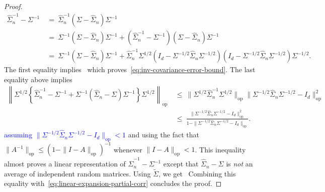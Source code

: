 \documentclass{article}
\begin{document}
\begin{appendices}
\begin{proof}
\begin{align*}
\widehat{\Sigma}_n^{-1} - \Sigma^{-1} ~&=~ \widehat{\Sigma}_n^{-1}(\Sigma - \widehat{\Sigma}_n)\Sigma^{-1}\\ ~&=~ \Sigma^{-1}(\Sigma - \widehat{\Sigma}_n)\Sigma^{-1} + (\widehat{\Sigma}_n^{-1} - \Sigma^{-1})(\Sigma - \widehat{\Sigma}_n)\Sigma^{-1}\\ ~&=~ \Sigma^{-1}(\Sigma - \widehat{\Sigma}_n)\Sigma^{-1} + \widehat{\Sigma}_n^{-1}\Sigma^{1/2}(I_d - \Sigma^{-1/2}\widehat{\Sigma}_n\Sigma^{-1/2})(I_d - \Sigma^{-1/2}\widehat{\Sigma}_n\Sigma^{-1/2})\Sigma^{-1/2}.
\end{align*}
The first equality implies
\ which proves~\eqref{eq:inv-covariance-error-bound}. The last equality above implies
\begin{equation}\label{eq:linear-expansion-partial-corr}
\begin{split}
\left\|\Sigma^{1/2}\left\{\widehat{\Sigma}_n^{-1} - \Sigma^{-1} + \Sigma^{-1}(\widehat{\Sigma}_n - \Sigma)\Sigma^{-1}\right\}\Sigma^{1/2}\right\|_{\mathrm{op}} ~&\le~ \|\Sigma^{1/2}\widehat{\Sigma}_n^{-1}\Sigma^{1/2}\|_{\mathrm{op}}\|\Sigma^{-1/2}\widehat{\Sigma}_n\Sigma^{-1/2} - I_d\|_{\mathrm{op}}^2\\ ~&\le~ \frac{\|\Sigma^{-1/2}\widehat{\Sigma}_n\Sigma^{-1/2} - I_d\|_{\mathrm{op}}^2}{1 - \|\Sigma^{-1/2}\widehat{\Sigma}_n\Sigma^{-1/2} - I_d\|_{\mathrm{op}}}.
\end{split}
\end{equation}
\textcolor{blue}{assuming $\|\Sigma^{-1/2}\widehat{\Sigma}_n\Sigma^{-1/2} - I_d\|_{\mathrm{op}} < 1$} and using the fact that $\|A^{-1}\|_{\mathrm{op}} \le (1 - \|I - A\|_{\mathrm{op}})^{-1}$ whenever $\|I - A\|_{\mathrm{op}} < 1$.
This inequality almost proves a linear representation of $\widehat{\Sigma}_n^{-1} - \Sigma^{-1}$ except that $\widehat{\Sigma}_n - \Sigma$ is \emph{not} an average of independent random matrices. Using $\widetilde{\Sigma}$, we get
\ Combining this equality with~\eqref{eq:linear-expansion-partial-corr} concludes the proof.
\end{proof}

\end{appendices}
\end{document}
